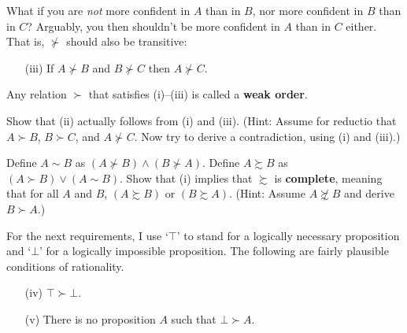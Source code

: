 What if you are \emph{not} more confident in $A$ than in $B$, nor more
confident in $B$ than in $C$? Arguably, you then shouldn't be more
confident in $A$ than in $C$ either. That is, $\not\succ$ should also
be transitive:
\begin{itemize}
  \item[(iii)] If $A \not\succ B$ and  $B \not\succ C$ then $A \not\succ C$.
\end{itemize}

Any relation $\succ$ that satisfies (i)--(iii) is called a
\textbf{weak order}.


\begin{exercise}
  Show that (ii) actually follows from (i) and (iii). (Hint: Assume
  for reductio that $A \succ B$, $B \succ C$, and $A \not\succ C$. Now
  try to derive a contradiction, using (i) and (iii).)
\end{exercise}

\begin{exercise}
  Define $A \sim B$ as $(A \not\succ B) \land (B \not\succ A)$. Define
  $A \succsim B$ as $(A \succ B) \lor (A \sim B)$. Show that (i)
  implies that $\succsim$ is \textbf{complete}, meaning that for all
  $A$ and $B$, $(A \succsim B)$ or $(B \succsim A)$. (Hint: Assume
  $A\not\succsim B$ and derive $B \succ A$.)  
\end{exercise}


For the next requirements, I use `$\top$' to stand for a logically
necessary proposition and `$\bot$' for a logically impossible
proposition. The following are fairly plausible conditions of
rationality.

\begin{itemize}
\item[(iv)] $\top \succ \bot$.
\item[(v)] There is no proposition $A$ such that $\bot \succ A$.
\end{itemize}

